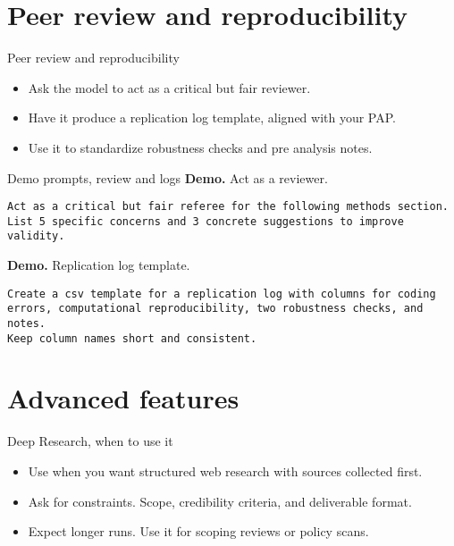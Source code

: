 \documentclass[aspectratio=169,professionalfonts]{beamer}
\newcommand{\demo}{\textbf{Demo. }}
\begin{document}
\section{Peer review and reproducibility}

\begin{frame}{Peer review and reproducibility}
  \begin{itemize}
    \item Ask the model to act as a critical but fair reviewer.
    \item Have it produce a replication log template, aligned with your PAP.
    \item Use it to standardize robustness checks and pre analysis notes.
  \end{itemize}
\end{frame}

\begin{frame}[fragile]{Demo prompts, review and logs}
\demo Act as a reviewer.
\begin{verbatim}
Act as a critical but fair referee for the following methods section.
List 5 specific concerns and 3 concrete suggestions to improve validity.
\end{verbatim}

\demo Replication log template.
\begin{verbatim}
Create a csv template for a replication log with columns for coding
errors, computational reproducibility, two robustness checks, and notes.
Keep column names short and consistent.
\end{verbatim}
\end{frame}

\section{Advanced features}

\begin{frame}{Deep Research, when to use it}
  \begin{itemize}
    \item Use when you want structured web research with sources collected first.
    \item Ask for constraints. Scope, credibility criteria, and deliverable format.
    \item Expect longer runs. Use it for scoping reviews or policy scans.
  \end{itemize}
\end{frame}
\end{document}
